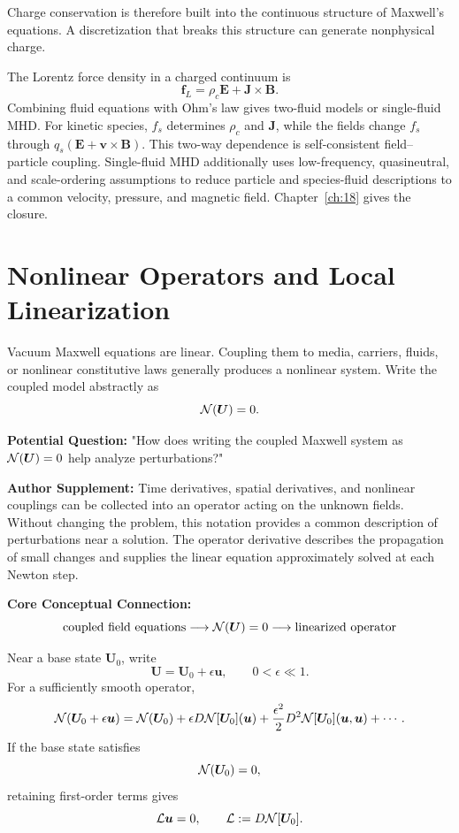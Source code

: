 Charge conservation is therefore built into the continuous structure of Maxwell's equations. A discretization that breaks this structure can generate nonphysical charge.

The Lorentz force density in a charged continuum is
\[
\bm f_L=\rho_c\bm E+\bm J\times\bm B.
\]
Combining fluid equations with Ohm's law gives two-fluid models or single-fluid MHD.
For kinetic species, $f_s$ determines $\rho_c$ and $\bm J$, while the fields change $f_s$ through $q_s(\bm E+\bm v\times\bm B)$. This two-way dependence is self-consistent field--particle coupling. Single-fluid MHD additionally uses low-frequency, quasineutral, and scale-ordering assumptions to reduce particle and species-fluid descriptions to a common velocity, pressure, and magnetic field. Chapter~\ref{ch:18} gives the closure.

\section{Nonlinear Operators and Local Linearization}
Vacuum Maxwell equations are linear. Coupling them to media, carriers, fluids, or nonlinear constitutive laws generally produces a nonlinear system. Write the coupled model abstractly as
\[
\mathcal N(\bm U)=0.
\]

\begin{authornote}
\textbf{Potential Question:}
"How does writing the coupled Maxwell system as \(\mathcal N(\bm U)=0\) help analyze perturbations?"

\textbf{Author Supplement:}
Time derivatives, spatial derivatives, and nonlinear couplings can be collected into an operator acting on the unknown fields. Without changing the problem, this notation provides a common description of perturbations near a solution. The operator derivative describes the propagation of small changes and supplies the linear equation approximately solved at each Newton step.

\textbf{Core Conceptual Connection:}
\[
\text{coupled field equations}
\longrightarrow
\mathcal N(\bm U)=0
\longrightarrow
\text{linearized operator}
\]
\end{authornote}

Near a base state \(\bm U_0\), write
\[
\bm U=\bm U_0+\epsilon\bm u,
\qquad 0<\epsilon\ll1.
\]
For a sufficiently smooth operator,
\[
\mathcal N(\bm U_0+\epsilon\bm u)
=
\mathcal N(\bm U_0)
+\epsilon D\mathcal N[\bm U_0](\bm u)
+\frac{\epsilon^2}{2}
D^2\mathcal N[\bm U_0](\bm u,\bm u)
+\cdots.
\]
If the base state satisfies
\[
\mathcal N(\bm U_0)=0,
\]
retaining first-order terms gives
\[
\mathcal L\bm u=0,
\qquad
\mathcal L:=D\mathcal N[\bm U_0].
\]

